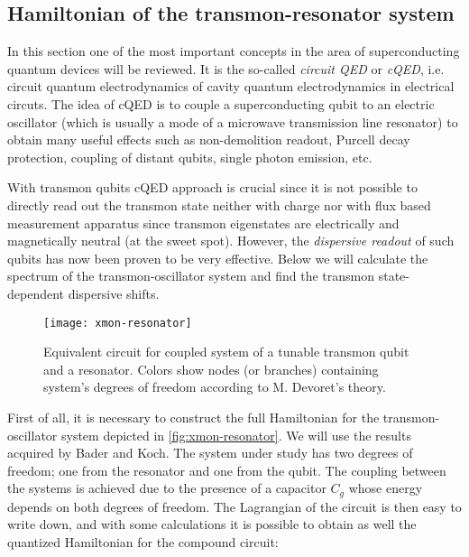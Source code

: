 \documentclass[12pt, twoside]{report}
\numberwithin{equation}{section}
\begin{document}
\subsection{Hamiltonian of the transmon-resonator system}

In this section one of the most important concepts in the area of superconducting quantum devices will be reviewed. It is the so-called \textit{circuit QED} or \textit{cQED}, i.e. circuit quantum electrodynamics of cavity quantum electrodynamics in electrical circuts\cite{Blais2004}. The idea of cQED is to couple a superconducting qubit to an electric oscillator (which is usually a mode of a microwave transmission line resonator) to obtain many useful effects such as non-demolition readout\cite{Blais2004}, Purcell decay protection\cite{Koch2007}, coupling of distant qubits\cite{Majer2007}, single photon emission\cite{bozyigit2011}, etc.

With transmon qubits cQED approach is crucial since it is not possible to directly read out the transmon state neither with charge nor with flux based measurement apparatus since transmon eigenstates are electrically and magnetically neutral (at the sweet spot). However, the \textit{dispersive readout}\cite{Blais2004} of such qubits has now been proven to be very effective. Below we will calculate the spectrum of the transmon-oscillator system and find the transmon state-dependent dispersive shifts.

\begin{figure}
\centering
\texttt{[image: xmon-resonator]}
\caption{Equivalent circuit for coupled system of a tunable transmon qubit and a resonator. Colors show nodes (or branches) containing system's degrees of freedom according to M. Devoret's theory\cite{Devoret1995}.}
\label{fig:xmon-resonator}
\end{figure}

First of all, it is necessary to construct the full Hamiltonian for the transmon-oscillator system depicted in \autoref{fig:xmon-resonator}. We will use the results acquired by Bader\cite{Bader2013} and Koch\cite{Koch2007}. The system under study has two degrees of freedom; one from the resonator and one from the qubit. The coupling between the systems is achieved due to the presence of a capacitor $C_g$ whose energy depends on both degrees of freedom. The Lagrangian of the circuit is then easy to write down, and with some calculations it is possible to obtain as well the quantized Hamiltonian for the compound circuit:
\end{document}
